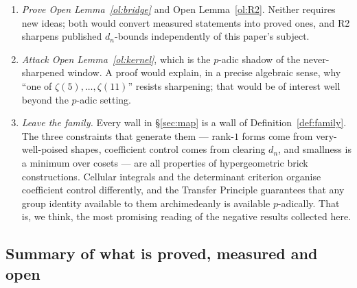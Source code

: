 \begin{enumerate}[label=\textup{(\arabic*)},leftmargin=2.6em,itemsep=4pt]
\item \emph{Prove Open Lemma~\ref{ol:bridge}} and Open Lemma~\ref{ol:R2}. Neither requires
      new ideas; both would convert measured statements into proved ones, and R2 sharpens
      published $d_n$-bounds independently of this paper's subject.

\item \emph{Attack Open Lemma~\ref{ol:kernel}}, which is the $p$-adic shadow of the
      never-sharpened window. A proof would explain, in a precise algebraic sense, why
      ``one of $\zeta(5),\dots,\zeta(11)$'' resists sharpening; that would be of interest
      well beyond the $p$-adic setting.

\item \emph{Leave the family.} Every wall in \S\ref{sec:map} is a wall of
      Definition~\ref{def:family}. The three constraints that generate them --- rank-$1$
      forms come from very-well-poised shapes, coefficient control comes from clearing
      $d_n$, and smallness is a minimum over cosets --- are all properties of hypergeometric
      brick constructions. Cellular integrals \cite{Brown2014,BrownZudilin2022} and the
      determinant criterion \cite{Brown2026} organise coefficient control differently, and
      the Transfer Principle guarantees that any group identity available to them
      archimedeanly is available $p$-adically. That is, we think, the most promising reading
      of the negative results collected here.
\end{enumerate}

\subsection{Summary of what is proved, measured and open}\label{ss:summary}


